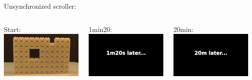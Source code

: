 {\begin{frame}
Unsynchronized scroller:
\begin{center}	
\begin{columns}[c]
	\begin{column}{.33\textwidth}
		\centering
		Start:\\
		\href{run:videos/31-unsync1.avi?autostart&loop&start=1}{\includegraphics[width=0.9\linewidth]{videos/31-unsync1.jpg}}
	\end{column}
	\begin{column}{.33\textwidth}
		\centering
		1min20:\\
		\href{run:videos/31-unsync2.avi?autostart&loop}{\includegraphics[width=0.95\linewidth]{videos/31-unsync2.jpg}}
	\end{column}  
	\begin{column}{.33\textwidth}
		\centering
		20min:\\
		\href{run:videos/31-unsync3.avi?autostart&loop}{\includegraphics[width=0.95\linewidth]{videos/31-unsync3.jpg}}

\end{column}
\end{columns}
\end{center}
\end{frame}}
